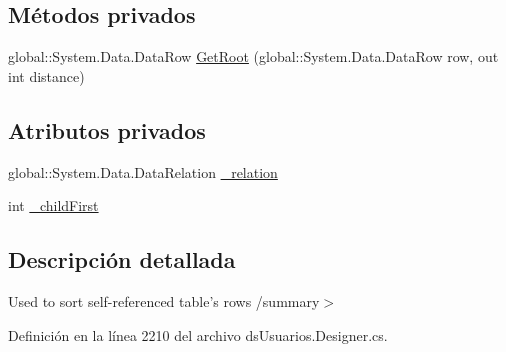 \subsection*{Métodos privados}
\begin{DoxyCompactItemize}
\item 
global\-::\-System.\-Data.\-Data\-Row \hyperlink{class_proyecto___integrador__3_1_1ds_usuarios_table_adapters_1_1_table_adapter_manager_1_1_self_reference_comparer_adbe612a7a1ed56040974c39de179a041}{Get\-Root} (global\-::\-System.\-Data.\-Data\-Row row, out int distance)
\end{DoxyCompactItemize}
\subsection*{Atributos privados}
\begin{DoxyCompactItemize}
\item 
global\-::\-System.\-Data.\-Data\-Relation \hyperlink{class_proyecto___integrador__3_1_1ds_usuarios_table_adapters_1_1_table_adapter_manager_1_1_self_reference_comparer_aa94b2ca3f3ea52c71719c2b968ae574a}{\-\_\-relation}
\item 
int \hyperlink{class_proyecto___integrador__3_1_1ds_usuarios_table_adapters_1_1_table_adapter_manager_1_1_self_reference_comparer_a0d9b911f3c6ab73098107a9d88aa85c6}{\-\_\-child\-First}
\end{DoxyCompactItemize}


\subsection{Descripción detallada}
Used to sort self-\/referenced table's rows /summary$>$ 

Definición en la línea 2210 del archivo ds\-Usuarios.\-Designer.\-cs.



